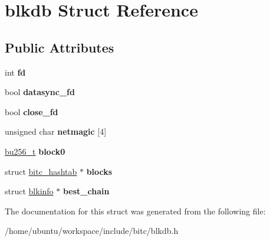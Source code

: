 \hypertarget{structblkdb}{\section{blkdb Struct Reference}
\label{structblkdb}
}
\subsection*{Public Attributes}
\begin{DoxyCompactItemize}
\item 
\hypertarget{structblkdb_af8adc6ef16ca8a250edabf2d5217cf8f}{int {\bfseries fd}}\label{structblkdb_af8adc6ef16ca8a250edabf2d5217cf8f}

\item 
\hypertarget{structblkdb_aca739298c5c904a940b558e77275bd84}{bool {\bfseries datasync\-\_\-fd}}\label{structblkdb_aca739298c5c904a940b558e77275bd84}

\item 
\hypertarget{structblkdb_a4d641b25e98c9a831cf409c2cda9b55d}{bool {\bfseries close\-\_\-fd}}\label{structblkdb_a4d641b25e98c9a831cf409c2cda9b55d}

\item 
\hypertarget{structblkdb_a4d368b513f2c27d054802c96251da51b}{unsigned char {\bfseries netmagic} \mbox{[}4\mbox{]}}\label{structblkdb_a4d368b513f2c27d054802c96251da51b}

\item 
\hypertarget{structblkdb_ab984ac80c24afe1657379ca4f87dd48c}{\hyperlink{structbu256}{bu256\-\_\-t} {\bfseries block0}}\label{structblkdb_ab984ac80c24afe1657379ca4f87dd48c}

\item 
\hypertarget{structblkdb_a238629e33c23e00f95ea7ac96e1041bd}{struct \hyperlink{structbitc__hashtab}{bitc\-\_\-hashtab} $\ast$ {\bfseries blocks}}\label{structblkdb_a238629e33c23e00f95ea7ac96e1041bd}

\item 
\hypertarget{structblkdb_a53bdbc6d1b2ee95f577e2dad72452428}{struct \hyperlink{structblkinfo}{blkinfo} $\ast$ {\bfseries best\-\_\-chain}}\label{structblkdb_a53bdbc6d1b2ee95f577e2dad72452428}

\end{DoxyCompactItemize}


The documentation for this struct was generated from the following file\-:\begin{DoxyCompactItemize}
\item 
/home/ubuntu/workspace/include/bitc/blkdb.\-h\end{DoxyCompactItemize}
